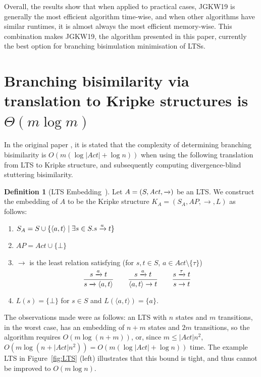 \documentclass[a4paper,10pt]{article}
\theoremstyle{definition}
\newtheorem{definition}{Definition}[section]
\theoremstyle{plain}
\newcommand{\bigo}[1]{{O\!\left(#1\right)}}
\newcommand{\pijl}[1]{\mathrel{\text{$\xrightarrow{\smash[t]{#1}}$}}}
\newcommand{\size}[1]{\left\lvert #1 \right\rvert}
\begin{document}
Overall, the results show that when applied to practical cases, JGKW19 is generally the most efficient algorithm time-wise,
and when other algorithms have similar runtimes, it is almost always the most efficient memory-wise.
This combination makes JGKW19, the algorithm presented in this paper, currently the best option for branching bisimulation minimisation of LTSs.




\appendix

\section{Branching bisimilarity via translation to Kripke structures is $\Theta(m \log m)$}
\label{app:complexity_via_stuttering}

In the original paper \cite{GJKW2017},
it is stated that the complexity of determining branching bisimilarity is $\bigo{m (\log \size{\mathit{Act}} + \log n)}$
when using the following translation from LTS to Kripke structure,
and subsequently computing divergence-blind stuttering bisimilarity.

\begin{definition}[LTS Embedding~\cite{dNV1995}]
Let $A = (S, \mathit{Act}, \mathord{\pijl{}})$ be an LTS.
We construct the embedding of $A$ to be the Kripke structure $K_A = (S_A, \mathit{AP}, \to, L)$ as follows:
\begin{enumerate}
	\item $S_A = S \cup \{ \langle a,t \rangle \mid \exists s \in S . s \pijl{a} t \}$
	\item $\mathit{AP} = \mathit{Act} \cup \{ \bot \}$
	\item $\to$ is the least relation satisfying (for $s,t \in S$, $a \in \mathit{Act} \setminus \{ \tau \}$)
	\[\frac{s\pijl{a}{}t}{s\pijl{}{}\langle a,t\rangle} \qquad
	\frac{s\pijl{a}t}{\langle a,t\rangle \to t} \qquad
	\frac{s\pijl{\tau}t}{s \to t}\]
	\item
	$L(s)=\{\bot\}$ for $s\in S$ and $L(\langle a,t\rangle)=\{a\}$.
	\end{enumerate}
\end{definition}

The observations made were as follows:
an LTS with $n$ states and $m$ transitions, in the worst case,
has an embedding of $n + m$ states and $2m$ transitions,
so the algorithm requires $\bigo{m \log (n+m)}$,
or, since $m \leq \size{\mathit{Act}}n^2$,
$\bigo{m \log (n+\size{\mathit{Act}}n^2)} = \bigo{m (\log \size{\mathit{Act}} + \log n)}$ time.
The example LTS in Figure~\ref{fig:LTS} (left) illustrates that this bound is tight, and thus cannot be improved to $\bigo{m \log n}$.
\end{document}
